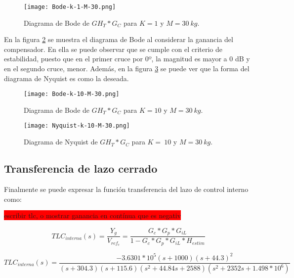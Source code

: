 \begin{figure}[H]
	\centering
	\texttt{[image: Bode-k-1-M-30.png]}
	\caption{Diagrama de Bode de $GH_T*G_C$ para $K=1$ y $M=30\:kg$.}
	\label{fig:bode-analog-compensado-para-k-1}
\end{figure}

\noindent En la figura \ref{fig:bode-analog-compensado-para-k-10} se muestra el diagrama de Bode al considerar la ganancia del compensador. En ella se puede observar que se  cumple con el criterio de estabilidad, puesto que en el primer cruce por 0º, la magnitud es mayor a 0 dB y en el segundo cruce, menor. Adem\'{a}s, en la figura \ref{fig:nyquist-analog-para-k-10} se puede ver que la forma del diagrama de Nyquist es como la deseada.

\begin{figure}[H]
	\centering
	\texttt{[image: Bode-k-10-M-30.png]}
	\caption{Diagrama de Bode de $GH_{T}*G_C$ para $K=10$ y $M=30\:kg$.}
	\label{fig:bode-analog-compensado-para-k-10}
\end{figure}

\begin{figure}[H]
	\centering
	\texttt{[image: Nyquist-k-10-M-30.png]}
	\caption{Diagrama de Nyquist de $GH_T*G_C$ para $K=\:10$ y $M=30\:kg$.}
	\label{fig:nyquist-analog-para-k-10}
\end{figure}

\subsection{Transferencia de lazo cerrado}

Finalmente se puede expresar la función transferencia del lazo de control interno como:
%

\colorbox{red}{escribir tlc, o mostrar ganancia en contínua que es negativ}

\begin{equation}
	TLC_{interna}(s)=\frac{Y_g}{V_{ref_c}}=\frac{G_c*G_{p}*G_{iL}}{1-G_c*G_{p}*G_{iL}*H_{estim}}
\end{equation}

\begin{equation}
	TLC_{interna}(s)=\frac{-3.6301*10^5(s+1000)(s+44.3)^2}{(s+304.3) (s+115.6) (s^2 + 44.84s + 2588) (s^2 + 2352s + 1.498*10^6)}	
\end{equation}
%
%

